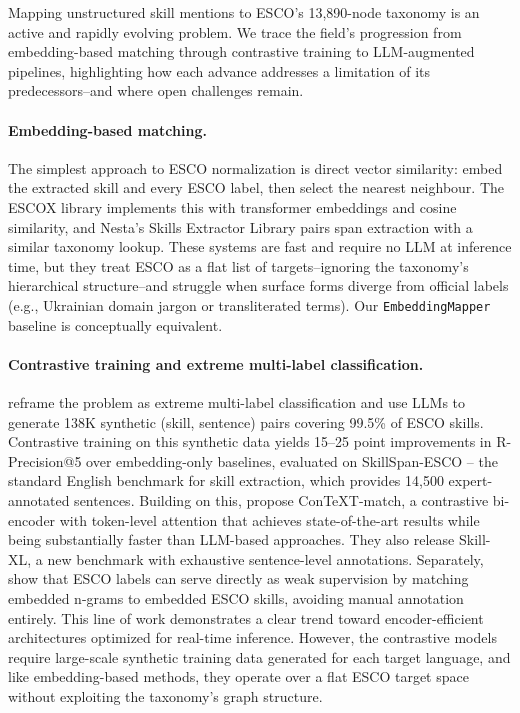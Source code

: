 \documentclass[11pt]{article}
\begin{document}
Mapping unstructured skill mentions to ESCO's 13,890-node taxonomy is an active and rapidly evolving problem. We trace the field's progression from embedding-based matching through contrastive training to LLM-augmented pipelines, highlighting how each advance addresses a limitation of its predecessors--and where open challenges remain.

\paragraph{Embedding-based matching.}
The simplest approach to ESCO normalization is direct vector similarity: embed the extracted skill and every ESCO label, then select the nearest neighbour. The ESCOX library \citep{Kavargyris2025} implements this with transformer embeddings and cosine similarity, and Nesta's Skills Extractor Library \citep{nesta} pairs span extraction with a similar taxonomy lookup. These systems are fast and require no LLM at inference time, but they treat ESCO as a flat list of targets--ignoring the taxonomy's hierarchical structure--and struggle when surface forms diverge from official labels (e.g., Ukrainian domain jargon or transliterated terms). Our \texttt{EmbeddingMapper} baseline is conceptually equivalent.

\paragraph{Contrastive training and extreme multi-label classification.}
\citet{Decorte2023} reframe the problem as extreme multi-label classification and use LLMs to generate 138K synthetic (skill, sentence) pairs covering 99.5\% of ESCO skills. Contrastive training on this synthetic data yields 15--25 point improvements in R-Precision@5 over embedding-only baselines, evaluated on SkillSpan-ESCO \citep{Zhang2022} -- the standard English benchmark for skill extraction, which provides 14,500 expert-annotated sentences. Building on this, \citet{Decorte2025} propose ConTeXT-match, a contrastive bi-encoder with token-level attention that achieves state-of-the-art results while being substantially faster than LLM-based approaches. They also release Skill-XL, a new benchmark with exhaustive sentence-level annotations. Separately, \citet{zhang2022skillextractionjobpostings} show that ESCO labels can serve directly as weak supervision by matching embedded n-grams to embedded ESCO skills, avoiding manual annotation entirely. This line of work demonstrates a clear trend toward encoder-efficient architectures optimized for real-time inference. However, the contrastive models require large-scale synthetic training data generated for each target language, and like embedding-based methods, they operate over a flat ESCO target space without exploiting the taxonomy's graph structure.
\end{document}
